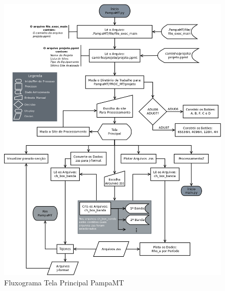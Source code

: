     \begin{figure}[H]
                \caption{Fluxograma Tela Principal PampaMT}
                \begin{center}
                    \includegraphics[width=15cm]{texto/fig/PampaMTpy2.png} 
                \end{center}
                \label{fig_influ_pampamtpy} 
            \end{figure}
            
